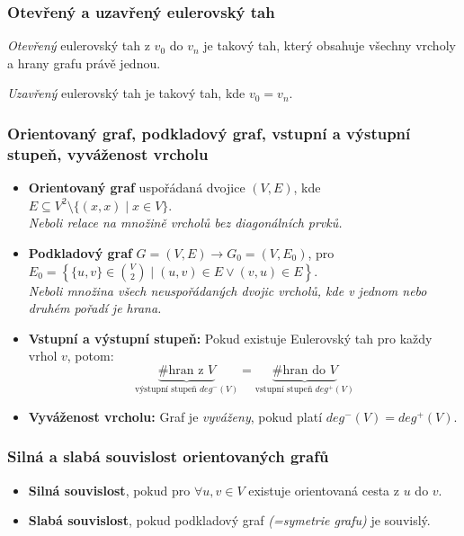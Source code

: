 \documentclass[10pt,a4paper]{article}
\begin{document}
\subsubsection{Otevřený a uzavřený eulerovský tah}
\textit{Otevřený} eulerovský tah z $v_0$ do $v_n$ je takový tah, který obsahuje všechny vrcholy a hrany grafu právě jednou. 

\textit{Uzavřený} eulerovský tah je takový tah, kde $v_0 = v_n$.
\subsubsection{Orientovaný graf, podkladový graf, vstupní a výstupní stupeň, vyváženost vrcholu}

\begin{itemize}
    \item \textbf{Orientovaný graf} uspořádaná dvojice $(V, E)$, kde $E \subseteq V^2 \setminus \{(x, x) \mid x \in V\}$.\\\textit{Neboli relace na množině vrcholů bez diagonálních prvků.}
    \item \textbf{Podkladový graf} $G = (V, E) \to G_0=(V, E_0)$, pro $E_0 = \left \{\{u,v\} \in \binom V2 \mid (u,v)\in E \lor (v,u) \in E \right \}$.\\\textit{Neboli množina všech neuspořádaných dvojic vrcholů, kde v jednom nebo druhém pořadí je hrana.}
    \item \textbf{Vstupní a výstupní stupeň:} Pokud existuje Eulerovský tah pro každy vrhol $v$, potom:
    \[
        \underbrace{\# \text{hran z }V}_{\text{výstupní stupeň } deg^-(V)} = \underbrace{\# \text{hran do }V}_{\text{vstupní stupeň } deg^+(V)}
    \]
    \item \textbf{Vyváženost vrcholu:} Graf je \textit{vyváženy}, pokud platí $deg^-(V) = deg^+(V)$.
\end{itemize}

\subsubsection{Silná a slabá souvislost orientovaných grafů}
\begin{itemize}
    \item \textbf{Silná souvislost}, pokud pro $\forall u,v \in V$ existuje orientovaná cesta z $u$ do $v$.
    \item \textbf{Slabá souvislost}, pokud podkladový graf \textit{(=symetrie grafu)} je souvislý.
\end{itemize}
\end{document}
